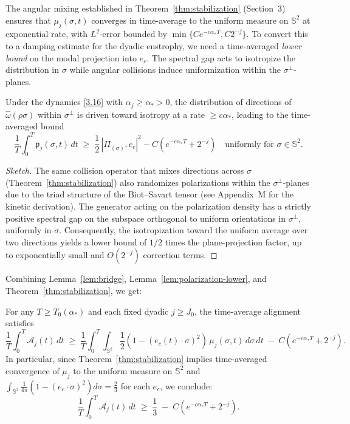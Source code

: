 \documentclass[11pt]{article}
\begin{document}
The angular mixing established in Theorem~\ref{thm:stabilization} (Section~3) ensures that $\mu_j(\sigma,t)$ converges in time-average to the uniform measure on $\mathbb{S}^2$ at exponential rate, with $L^2$-error bounded by $\min\{C e^{-c \alpha_* T}, C 2^{-j}\}$. To convert this to a damping estimate for the dyadic enstrophy, we need a time-averaged \emph{lower bound} on the modal projection into $e_c$. The spectral gap acts to isotropize the distribution in $\sigma$ while angular collisions induce uniformization within the $\sigma^\perp$-planes.

\begin{lemma} \label{lem:polarization-lower}
Under the dynamics \eqref{3.16} with $\alpha_j \geq \alpha_* > 0$, the distribution of directions of $\widehat{\omega}(\rho\sigma)$ within $\sigma^\perp$ is driven toward isotropy at a rate $\geq c \alpha_*$, leading to the time-averaged bound
\[
\frac{1}{T}\int_0^T \mathfrak{p}_j(\sigma, t) \, dt \;\geq\; \frac{1}{2} \, |\Pi_{(\sigma)^\perp} e_c|^2 - C \left( e^{-c \alpha_* T} + 2^{-j} \right) \quad \text{uniformly for } \sigma \in \mathbb{S}^2. \tag{4.4}
\]
\end{lemma}

\begin{proof}[Sketch]
The same collision operator that mixes directions across $\sigma$ (Theorem~\ref{thm:stabilization}) also randomizes polarizations within the $\sigma^\perp$-planes due to the triad structure of the Biot--Savart tensor (see Appendix~M for the kinetic derivation). The generator acting on the polarization density has a strictly positive spectral gap on the subspace orthogonal to uniform orientations in $\sigma^\perp$, uniformly in $\sigma$. Consequently, the isotropization toward the uniform average over two directions yields a lower bound of $1/2$ times the plane-projection factor, up to exponentially small and $O(2^{-j})$ correction terms.
\end{proof}

Combining Lemma~\ref{lem:bridge}, Lemma~\ref{lem:polarization-lower}, and Theorem~\ref{thm:stabilization}, we get:

\begin{proposition} \label{prop:bridge-stab}
For any $T \geq T_0(\alpha_*)$ and each fixed dyadic $j \geq J_0$, the time-average alignment satisfies
\[
\frac{1}{T} \int_0^T \mathcal{A}_j(t) \, dt 
\;\geq\; \frac{1}{T} \int_0^T \int_{\mathbb{S}^2} \frac{1}{2} \left( 1 - (e_c(t)\cdot \sigma)^2 \right) \, \mu_j(\sigma, t) \, d\sigma \, dt \;-\; C \left( e^{-c \alpha_* T} + 2^{-j} \right).
\]
In particular, since Theorem~\ref{thm:stabilization} implies time-averaged convergence of $\mu_j$ to the uniform measure on $\mathbb{S}^2$ and $\int_{\mathbb{S}^2} \frac{1}{4\pi} \left( 1 - (e_c\cdot \sigma)^2 \right) d\sigma = \frac{2}{3}$ for each $e_c$, we conclude:
\begin{equation}
\frac{1}{T} \int_0^T \mathcal{A}_j(t) \, dt \;\geq\; \frac{1}{3} \;-\; C \left( e^{-c \alpha_* T} + 2^{-j} \right). \tag{4.5}
\end{equation}
\end{proposition}
\end{document}
